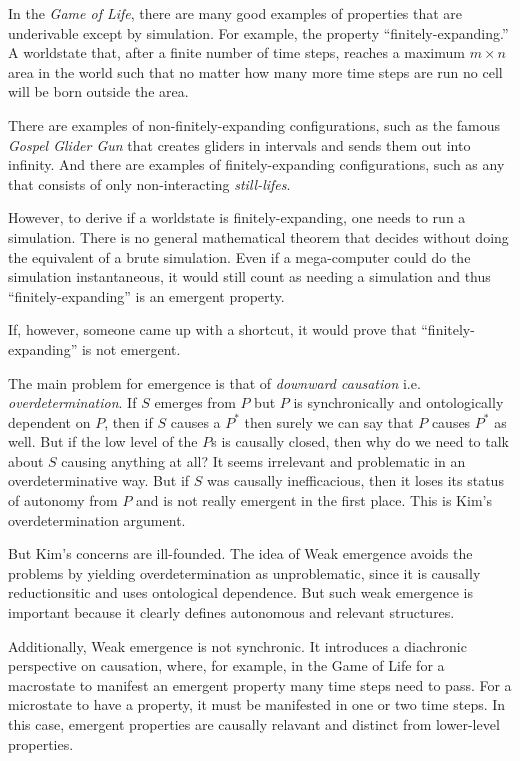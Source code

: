 \documentclass{article}
\newcommand{\ti}[1]{\textit{#1}}
\begin{document}
In the \ti{Game of Life}, there are many good examples of properties that are underivable except by simulation. For example, the property ``finitely-expanding.'' A worldstate that, after a finite number of time steps, reaches a maximum $m \times n$ area in the world such that no matter how many more time steps are run no cell will be born outside the area.

There are examples of non-finitely-expanding configurations, such as the famous \ti{Gospel Glider Gun} that creates gliders in intervals and sends them out into infinity. And there are examples of finitely-expanding configurations, such as any that consists of only non-interacting \ti{still-lifes}.

However, to derive if a worldstate is finitely-expanding, one needs to run a simulation. There is no general mathematical theorem that decides without doing the equivalent of a brute simulation. Even if a mega-computer could do the simulation instantaneous, it would still count as needing a simulation and thus ``finitely-expanding'' is an emergent property.

If, however, someone came up with a shortcut, it would prove that ``finitely-expanding'' is not emergent.

The main problem for emergence is that of \ti{downward causation} i.e. \ti{overdetermination}. If $S$ emerges from $P$ but $P$ is synchronically and ontologically dependent on $P$, then if $S$ causes a $P^*$ then surely we can say that $P$ causes $P^*$ as well. But if the low level of the $P$s is causally closed, then why do we need to talk about $S$ causing anything at all? It seems irrelevant and problematic in an overdeterminative way. But if $S$ was causally inefficacious, then it loses its status of autonomy from $P$ and is not really emergent in the first place. This is Kim's overdetermination argument.

But Kim's concerns are ill-founded. The idea of Weak emergence avoids the problems by yielding overdetermination as unproblematic, since it is causally reductionsitic and uses ontological dependence. But such weak emergence is important because it clearly defines autonomous and relevant structures.

Additionally, Weak emergence is not synchronic. It introduces a diachronic perspective on causation, where, for example, in the Game of Life for a macrostate to manifest an emergent property many time steps need to pass. For a microstate to have a property, it must be manifested in one or two time steps. In this case, emergent properties are causally relavant and distinct from lower-level properties.
\end{document}
